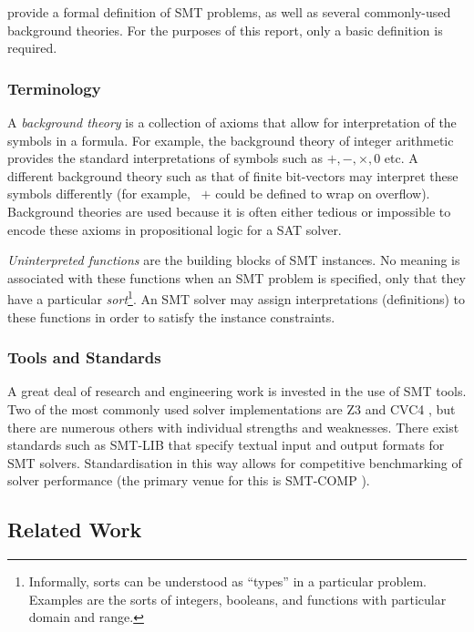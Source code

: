 \textcite[ch.\ 12]{biere_handbook_2009} provide a formal definition of SMT
problems, as well as several commonly-used background theories. For the purposes
of this report, only a basic definition is required.

\subsubsection{Terminology}

A \emph{background theory} is a collection of axioms that allow for
interpretation of the symbols in a formula. For example, the background theory
of integer arithmetic provides the standard interpretations of symbols such as $
+, -, \times, 0 $ etc. A different background theory such as that of finite
bit-vectors may interpret these symbols differently (for example, \ $+$ could be
defined to wrap on overflow). Background theories are used because it is often
either tedious or impossible to encode these axioms in propositional logic for a
SAT solver.

\emph{Uninterpreted functions} are the building blocks of SMT instances. No
meaning is associated with these functions when an SMT problem is specified,
only that they have a particular \emph{sort}\footnote{Informally, sorts can be
understood as ``types'' in a particular problem. Examples are the sorts of
integers, booleans, and functions with particular domain and range.}. An SMT
solver may assign interpretations (definitions) to these functions in order to
satisfy the instance constraints.

\subsubsection{Tools and Standards}

A great deal of research and engineering work is invested in the use of SMT
tools. Two of the most commonly used solver implementations are Z3
\cite{de_moura_z3:_2008} and CVC4 \cite{barrett_cvc4_2011}, but there are
numerous others with individual strengths and weaknesses. There exist standards
such as SMT-LIB \cite{BarFT-SMTLIB} that specify textual input and output
formats for SMT solvers. Standardisation in this way allows for competitive
benchmarking of solver performance (the primary venue for this is SMT-COMP
\cite{CDW14}).

\subsection{Related Work}

